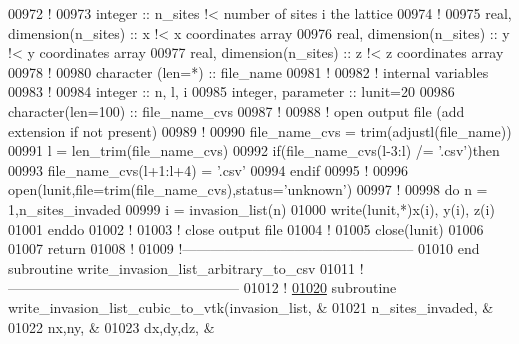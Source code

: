 \begin{DoxyCode}
00972 \textcolor{comment}{!}
00973 \textcolor{keywordtype}{integer} :: n\_sites \textcolor{comment}{!< number of sites i the lattice}
00974 \textcolor{comment}{!}
00975 \textcolor{keywordtype}{real}, \textcolor{keywordtype}{dimension(n\_sites)} :: x \textcolor{comment}{!< x coordinates array}
00976 \textcolor{keywordtype}{real}, \textcolor{keywordtype}{dimension(n\_sites)} :: y \textcolor{comment}{!< y coordinates array}
00977 \textcolor{keywordtype}{real}, \textcolor{keywordtype}{dimension(n\_sites)} :: z \textcolor{comment}{!< z coordinates array}
00978 \textcolor{comment}{!}
00980 \textcolor{keywordtype}{character (len=*)} :: file\_name 
00981 \textcolor{comment}{!}
00982 \textcolor{comment}{! internal variables}
00983 \textcolor{comment}{!}
00984 \textcolor{keywordtype}{integer} :: n, l, i
00985 \textcolor{keywordtype}{integer}, \textcolor{keywordtype}{parameter} :: lunit=20
00986 \textcolor{keywordtype}{character(len=100)} :: file\_name\_cvs
00987 \textcolor{comment}{!}
00988 \textcolor{comment}{! open output file (add extension if not present)}
00989 \textcolor{comment}{!}
00990 file\_name\_cvs = trim(adjustl(file\_name))
00991 l = len\_trim(file\_name\_cvs)
00992 \textcolor{keyword}{if}(file\_name\_cvs(l-3:l) /= \textcolor{stringliteral}{'.csv'})\textcolor{keyword}{then}
00993    file\_name\_cvs(l+1:l+4) = \textcolor{stringliteral}{'.csv'}
00994 \textcolor{keyword}{endif}
00995 \textcolor{comment}{!}
00996 \textcolor{keyword}{open}(lunit,file=trim(file\_name\_cvs),status=\textcolor{stringliteral}{'unknown'})
00997 \textcolor{comment}{!}
00998 \textcolor{keyword}{do} n = 1,n\_sites\_invaded
00999    i = invasion\_list(n)
01000    \textcolor{keyword}{write}(lunit,*)x(i), y(i), z(i)
01001 \textcolor{keyword}{enddo}
01002 \textcolor{comment}{!}
01003 \textcolor{comment}{! close output file}
01004 \textcolor{comment}{!}
01005 \textcolor{keyword}{close}(lunit)
01006 
01007 return
01008 \textcolor{comment}{!}
01009 \textcolor{comment}{!--------------------------------------------------}
01010 \textcolor{keyword}{end subroutine write\_invasion\_list\_arbitrary\_to\_csv}
01011 \textcolor{comment}{!--------------------------------------------------}
01012 \textcolor{comment}{!}
\hypertarget{module__write__output__files_8f90_source_l01020}{}\hyperlink{classmodule__write__output__files_abb1500b4855d9613b65549901c2b3a75}{01020} \textcolor{keyword}{subroutine }write\_invasion\_list\_cubic\_to\_vtk(invasion\_list,   &
01021                                             n\_sites\_invaded, &
01022                                             nx,ny,           &
01023                                             dx,dy,dz,        &

\end{DoxyCode}
